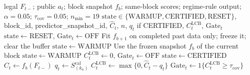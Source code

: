 \documentclass[letterpaper,journal]{IEEEtran}
\begin{document}
\begin{algorithm}[t]
\caption{Aggregate coverage certificate (formal Gate object)}
\label{alg:agg_certificate}
\begin{algorithmic}[1]
\REQUIRE legal $F_{t-}$; public $a_t$; block snapshot $f_b$; same-block scores;
regime-rule output; $\alpha=0.05$; $\tau_{\mathrm{cov}}=0.05$; $n_{\min}=19$
\ENSURE $\mathrm{state}\in\{\mathrm{WARMUP},\mathrm{CERTIFIED},\mathrm{RESET}\}$,
block\_id, predictor\_snapshot\_id, $\widehat C_t$, $n$, $q_t$ if CERTIFIED,
$C^{\mathrm{LCB}}_t$, $\mathrm{Gate}_t$
\STATE $\mathrm{state}\leftarrow\mathrm{RESET}$, $\mathrm{Gate}_t\leftarrow\mathrm{OFF}$
\STATE Fit $f_{b+1}$ on completed past data only; freeze it; clear the buffer
\STATE $\mathrm{state}\leftarrow\mathrm{WARMUP}$
\ELSE
\STATE Use the frozen snapshot $f_b$ of the current block
\STATE $\mathrm{state}\leftarrow\mathrm{WARMUP}$
\STATE $C^{\mathrm{LCB}}_t\leftarrow 0$, $\mathrm{Gate}_t\leftarrow\mathrm{OFF}$
\ELSE
\STATE $\mathrm{state}\leftarrow\mathrm{CERTIFIED}$ 
\STATE $\widehat C_t\leftarrow f_b(F_{t-})$
\STATE $q_t\leftarrow S_{(k_n)}^{\mathrm{cal}}$ 
\STATE $C^{\mathrm{LCB}}_t\leftarrow\max\{0,\widehat C_t-q_t\}$
\STATE $\mathrm{Gate}_t\leftarrow 1\{C^{\mathrm{LCB}}_t\ge\tau_{\mathrm{cov}}\}$
\ENDIF
\ENDIF
\end{algorithmic}
\end{algorithm}
\end{document}
